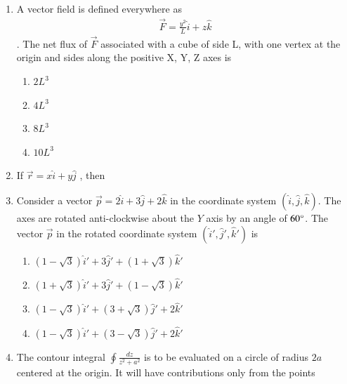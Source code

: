 \documentclass[journal,13pt,onecolumn]{IEEEtran}
\begin{document}
\begin{enumerate}[itemsep = 1em]
\item A vector field is defined everywhere as 
\begin{align*}
 \vec{F} = \frac{y^2}{L}\hat{i} + z\hat{k}   
\end{align*}.  The net flux of $\vec{F}$ associated with a cube of side L, with one vertex at the origin and sides along the positive X, Y, Z axes is

\hfill{}

\begin{multicols}{4}
\begin{enumerate}
    \item $2L^{3}$
    \item $4L^{3}$
    \item $8L^{3}$
    \item $10L^{3}$
    \end{enumerate}
\end{multicols}


\item If $\vec{r} = x\hat{i} + y\hat{j}$ , then

\hfill{}

\item Consider a vector $\vec{p} = 2\hat{i} + 3\hat{j} + 2\hat{k}$ in the coordinate system $(\hat{i},\hat{j},\hat{k})$. The axes are rotated anti-clockwise about the $Y$ axis by an angle of $60\degree$. The vector $\vec{p}$ in the rotated coordinate system $(\hat{i}',\hat{j}',\hat{k}')$ is

\hfill{}

\begin{enumerate}

\item $(1-\sqrt{3})\hat{i}' + 3\hat{j}' + (1+\sqrt{3})\hat{k}'$
\item $(1+\sqrt{3})\hat{i}' + 3\hat{j}' + (1-\sqrt{3})\hat{k}'$
\item $(1-\sqrt{3})\hat{i}' + (3+\sqrt{3})\hat{j}' + 2\hat{k}'$
\item $(1-\sqrt{3})\hat{i}' + (3-\sqrt{3})\hat{j}' + 2\hat{k}'$

\end{enumerate}

\vspace{2em}


\item The contour integral $\oint \frac{dz}{z^2+a^2}$ is to be evaluated on a circle of radius $2a$ centered at the origin. It will have contributions only from the points


\end{enumerate}
\end{document}
